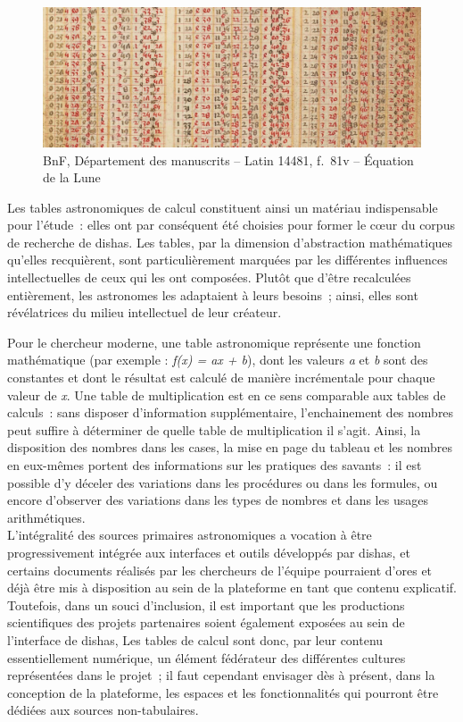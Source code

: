 \documentclass[a4paper,12pt,twoside]{book}
\newcommand{\dishas}{\gls{dishas}\xspace}
\begin{document}
\begin{figure}[h!]
	\centering
	\includegraphics[width=12cm]{Images/Latin_14481.png}
	\caption{BnF, Département des manuscrits – Latin 14481, f.~81v – Équation de la Lune}
\end{figure}

Les tables astronomiques de calcul constituent ainsi un matériau indispensable pour l'étude~: elles ont par conséquent été choisies pour former le cœur du corpus de recherche de \dishas. Les tables, par la dimension d'abstraction mathématiques qu'elles recquièrent, sont particulièrement marquées par les différentes influences intellectuelles de ceux qui les ont composées. Plutôt que d'être recalculées entièrement, les astronomes les adaptaient à leurs besoins~; ainsi, elles sont révélatrices du milieu intellectuel de leur créateur.

Pour le chercheur moderne, une table astronomique représente une fonction mathématique (par exemple : \emph{f(x) = ax + b}), dont les valeurs \emph{a} et \emph{b} sont des constantes et dont le résultat est calculé de manière incrémentale pour chaque valeur de \emph{x}. Une table de multiplication est en ce sens comparable aux tables de calculs~: sans disposer d'information supplémentaire, l'enchainement des nombres peut suffire à déterminer de quelle table de multiplication il s'agit. Ainsi, la disposition des nombres dans les cases, la mise en page du tableau et les nombres en eux-mêmes portent des informations sur les pratiques des savants~: il est possible d'y déceler des variations dans les procédures ou dans les formules, ou encore d'observer des variations dans les types de nombres et dans les usages arithmétiques.\\

L'intégralité des sources primaires astronomiques a vocation à être progressivement intégrée aux interfaces et outils développés par \dishas, et certains documents réalisés par les chercheurs de l'équipe pourraient d'ores et déjà être mis à disposition au sein de la plateforme en tant que contenu explicatif. Toutefois, dans un souci d'inclusion, il est important que les productions scientifiques des projets partenaires soient également exposées au sein de l'interface de \dishas, Les tables de calcul sont donc, par leur contenu essentiellement numérique, un élément fédérateur des différentes cultures représentées dans le projet~; il faut cependant envisager dès à présent, dans la conception de la plateforme, les espaces et les fonctionnalités qui pourront être dédiées aux sources non-tabulaires.
\end{document}
